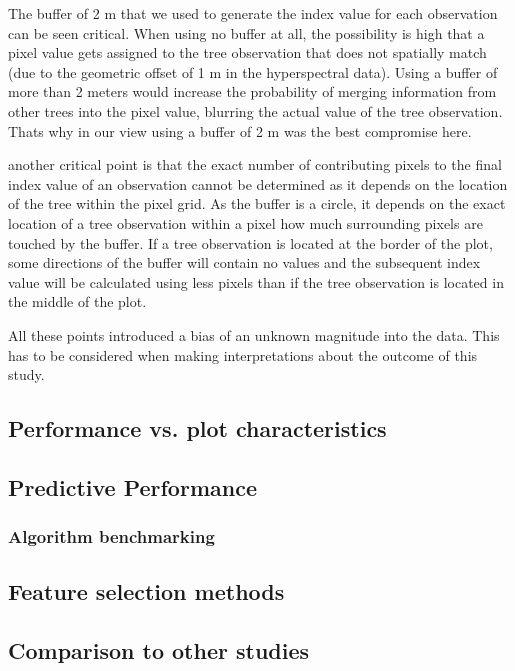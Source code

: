 \documentclass[review]{elsarticle}
\begin{document}
\noindent The buffer of 2 m that we used to generate the index value for each observation can be seen critical.
When using no buffer at all, the possibility is high that a pixel value gets assigned to the tree observation that does not spatially match (due to the geometric offset of 1 m in the hyperspectral data).
Using a buffer of more than 2 meters would increase the probability of merging information from other trees into the pixel value, blurring the actual value of the tree observation.
Thats why in our view using a buffer of 2 m was the best compromise here.

another critical point is that the exact number of contributing pixels to the final index value of an observation cannot be determined as it depends on the location of the tree within the pixel grid.
As the buffer is a circle, it depends on the exact location of a tree observation within a pixel how much surrounding pixels are touched by the buffer.
If a tree observation is located at the border of the plot, some directions of the buffer will contain no values and the subsequent index value will be calculated using less pixels than if the tree observation is located in the middle of the plot.

All these points introduced a bias of an unknown magnitude into the data.
This has to be considered when making interpretations about the outcome of this study.

\subsection{Performance vs. plot characteristics}

\subsection{Predictive Performance}

\subsubsection{Algorithm benchmarking}

\subsection{Feature selection methods}

\subsection{Comparison to other studies}
\end{document}
